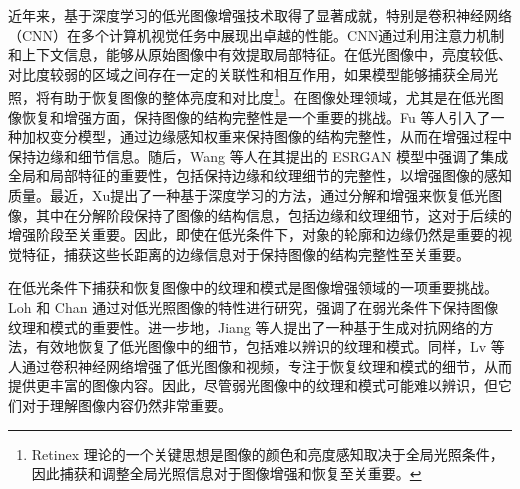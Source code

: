 \documentclass[a4paper, 10pt]{article}
\begin{document}
		
		近年来，基于深度学习的低光图像增强技术取得了显著成就，特别是卷积神经网络（CNN）在多个计算机视觉任务中展现出卓越的性能。CNN通过利用注意力机制\cite{yang2021locally,zhang2020attention}和上下文信息，能够从原始图像中有效提取局部特征\cite{jain1991unsupervised, lowe2004distinctive, ojala2002multiresolution}。在低光图像中，亮度较低、对比度较弱的区域之间存在一定的关联性和相互作用，如果模型能够捕获全局光照，将有助于恢复图像的整体亮度和对比度\cite{chen2018learning, wang2013naturalness}\footnote{Retinex 理论的一个关键思想是图像的颜色和亮度感知取决于全局光照条件，因此捕获和调整全局光照信息对于图像增强和恢复至关重要。}。在图像处理领域，尤其是在低光图像恢复和增强方面，保持图像的结构完整性是一个重要的挑战。Fu 等人\cite{fu2016weighted}引入了一种加权变分模型，通过边缘感知权重来保持图像的结构完整性，从而在增强过程中保持边缘和细节信息。随后，Wang 等人\cite{wang2018esrgan}在其提出的 ESRGAN 模型中强调了集成全局和局部特征的重要性，包括保持边缘和纹理细节的完整性，以增强图像的感知质量。最近，Xu\cite{xu2020learning}提出了一种基于深度学习的方法，通过分解和增强来恢复低光图像，其中在分解阶段保持了图像的结构信息，包括边缘和纹理细节，这对于后续的增强阶段至关重要。因此，即使在低光条件下，对象的轮廓和边缘仍然是重要的视觉特征，捕获这些长距离的边缘信息对于保持图像的结构完整性至关重要。
		
		在低光条件下捕获和恢复图像中的纹理和模式是图像增强领域的一项重要挑战。Loh 和 Chan\cite{loh2019getting} 通过对低光照图像的特性进行研究，强调了在弱光条件下保持图像纹理和模式的重要性。进一步地，Jiang 等人\cite{jiang2021enlightengan}提出了一种基于生成对抗网络的方法，有效地恢复了低光图像中的细节，包括难以辨识的纹理和模式。同样，Lv 等人\cite{lv2018mbllen}通过卷积神经网络增强了低光图像和视频，专注于恢复纹理和模式的细节，从而提供更丰富的图像内容。因此，尽管弱光图像中的纹理和模式可能难以辨识，但它们对于理解图像内容仍然非常重要。
		
\end{document}
